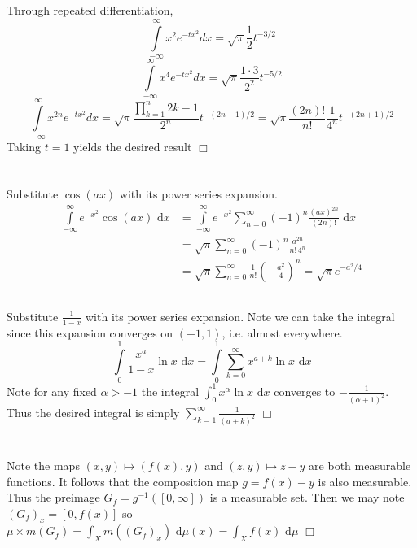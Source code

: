 \documentclass{article}
\begin{document}
\subsection{}
Through repeated differentiation,
$$\int\limits_{-\infty}^\infty x^2e^{-tx^2} dx = \sqrt{\pi}\frac{1}{2}t^{-3/2}$$
$$\int\limits_{-\infty}^\infty x^4e^{-tx^2} dx = \sqrt{\pi}\frac{1\cdot 3}{2^2}t^{-5/2}$$
$$\int\limits_{-\infty}^\infty x^{2n}e^{-tx^2} dx = \sqrt{\pi}\frac{\prod\limits_{k=1}^n 2k-1}{2^n}t^{-(2n+1)/2} = \sqrt{\pi}\frac{(2n)!}{n!} \frac{1}{4^n} t^{-(2n+1)/2} $$
Taking $t = 1$ yields the desired result $\Box$

\section{}
\subsection{}
Substitute $\cos(ax)$ with its power series expansion.
\begin{equation*}\begin{split}
  \int\limits_{-\infty}^\infty e^{-x^2}\cos(ax) \textrm{ d}x &= \int\limits_{-\infty}^\infty e^{-x^2}\sum\limits_{n = 0}^\infty (-1)^n\frac{(ax)^{2n}}{(2n)!} \textrm{ d}x\\
  &= \sqrt{\pi} \sum\limits_{n = 0}^\infty (-1)^n \frac{a^{2n}}{n!\,4^n}\\
  &= \sqrt{\pi} \sum\limits_{n=0}^\infty \frac{1}{n!}\left(-\frac{a^2}{4}\right)^n = \sqrt{\pi}e^{-a^2/4}
\end{split}\end{equation*}

\subsection{}
Substitute $\frac{1}{1-x}$ with its power series expansion. Note we can take the integral since this expansion converges on $(-1,1)$, i.e. almost everywhere.
$$\int\limits_0^1 \frac{x^a}{1-x}\ln x \textrm{ d}x = \int\limits_0^1 \sum\limits_{k=0}^{\infty} x^{a+k}\ln x \textrm{ d}x$$
Note for any fixed $\alpha>-1$ the integral $\int_0^1 x^\alpha \ln x \textrm{ d}x$ converges to $-\frac{1}{(\alpha +1)^2}$. Thus the desired integral is simply $\sum\limits_{k=1}^\infty \frac{1}{(a+k)^2}$ $\Box$

\section{}
Note the maps $(x,y) \mapsto (f(x),y)$ and $(z,y) \mapsto z-y$ are both measurable functions. It follows that the composition map $g = f(x) - y$ is also measurable. Thus the preimage $G_f = g^{-1}([0,\infty])$ is a measurable set. Then we may note $(G_f)_x = [0,f(x)]$ so $\mu \times m (G_f) = \int_X m((G_f)_x) \textrm{ d}\mu(x) = \int_X f(x) \textrm{ d}\mu$ $\Box$
\end{document}

